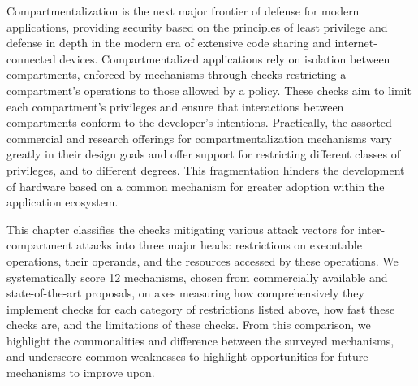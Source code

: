 \documentclass[lablogo]{thesis}
\newcommand{\nmechs}{12\xspace}
\begin{document}
Compartmentalization is the next major frontier of defense for 
modern applications, providing security based on the principles of 
least privilege and defense in depth
in the modern era of extensive code sharing and internet-connected devices.
Compartmentalized applications rely on isolation between compartments,
enforced by mechanisms through checks restricting a compartment's operations 
to those allowed by a policy.
These checks aim to limit each compartment's privileges and ensure that 
interactions between compartments conform to the developer's intentions.
Practically, the assorted commercial and research offerings for 
compartmentalization mechanisms vary greatly in their design goals and 
offer support for restricting different classes of privileges, and to
different degrees.
This fragmentation hinders the development of hardware based on a
common mechanism for greater adoption within the application ecosystem.


This chapter classifies the checks mitigating various attack vectors 
for inter-compartment attacks into three major heads:
restrictions on executable operations, their operands, and the resources 
accessed by these operations.
We systematically score \nmechs{} mechanisms, 
chosen from commercially available and state-of-the-art proposals, 
on axes measuring how comprehensively they implement checks for each 
category of restrictions listed above, how fast these checks are,
and the limitations of these checks.
From this comparison, we highlight the commonalities and difference
between the surveyed mechanisms, and underscore common weaknesses
to highlight opportunities for future mechanisms to improve upon.


% 
\end{document}
